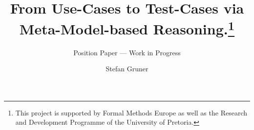 %
%
%
\documentclass[twocolumn]{svjour3}          %
\usepackage{graphicx}
\usepackage{mathptmx} %
\usepackage{latexsym}


\title{From Use-Cases to Test-Cases via Meta-Model-based Reasoning.\thanks{This 
     project is supported by Formal Methods Europe as well as the Research and 
     Development Programme of the University of Pretoria.}}
\subtitle{Position Paper --- Work in Progress}

\author{Stefan Gruner}


